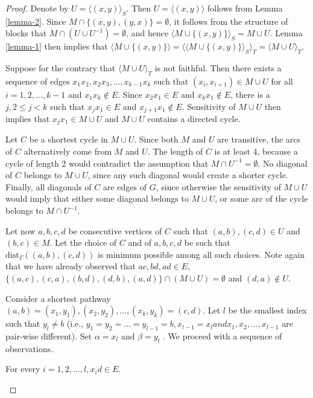 \begin{proof}
	Denote by $U = \langle(x, y)\rangle_S$. Then $U = \langle(x, y)\rangle$ follows from Lemma \ref{lemma-2}. Since $M \cap \{(x, y), (y, x)\} = \emptyset$, it follows from the structure of blocks that $M \cap (U \cup U^{-1}) = \emptyset$, and hence $\langle M \cup \{(x, y)\}\rangle_S = M \cup U$. Lemma \ref{lemma-1} then implies that $\langle M \cup \{(x, y)\}\rangle = \langle\langle M \cup \{(x, y)\}\rangle_S \rangle_T = \langle M \cup U \rangle_T$.
	
	Suppose for the contrary that $\langle M \cup U \rangle_T$ is not faithful. Then there exists a sequence of edges $x_1 x_2 , x_2 x_3 , \dots, x_{k-1} x_k$ such that $(x_i , x_{i+1}) \in M \cup U$ for all $i = 1, 2, \dots, k - 1$ and $x_1 x_k \notin E$. Since $x_2 x_1 \in E$ and $x_k x_1 \notin E$, there is a $j, 2 \leq j < k$ such that $x_j x_1 \in E$ and $x_{j+1} x_1 \notin E$. Sensitivity of $M \cup U$ then implies that $x_j x_1 \in M \cup U$ and $M \cup U$ contains a directed cycle.
	
	Let $C$ be a shortest cycle in $M \cup U$. Since both $M$ and $U$ are transitive, the arcs of $C$ alternatively come from $M$ and $U$. The length of $C$ is at least 4, because a cycle of length 2 would contradict the assumption that $M \cap U^{-1} = \emptyset$. No diagonal of $C$ belongs to $M \cup U$, since any such diagonal would create a shorter cycle. Finally, all diagonals of $C$ are edges of $G$, since otherwise the sensitivity of $M \cup U$ would imply that either some diagonal belongs to $M \cup U$, or some arc of the cycle belongs to $M \cap U^{-1}$.
	
	Let now $a, b, c, d$ be consecutive vertices of $C$ such that $(a, b), (c, d) \in U$ and $(b, c) \in M$. Let the choice of $C$ and of $a, b, c, d$ be such that $\text{dist}_\Gamma ((a, b), (c, d))$ is minimum possible among all such choices. Note again that we have already observed that $ac, bd, ad \in E$, $\{(a, c), (c, a), (b, d), (d, b), (a, d)\} \cap (M \cup U) = \emptyset$ and $(d, a) \notin U$.
	
	Consider a shortest pathway $(a, b) = (x_1 , y_1), (x_2 , y_2), \dots , (x_k , y_k) = (c, d)$. Let $l$ be the smallest
	index such that $y_l \neq b$ (i.e., $y_1 = y_2 = \dots = y_{l-1} = b, x_{l-1} = x_l and x_1 , x_2 , \dots , x_{l-1}$ are pair-wise
	different). Set $\alpha = x_l$ and $\beta = y_l$ . We proceed with a sequence of observations.

	\begin{claim}
		For every $i = 1, 2, \dots , l, x_i d \in E$.
	\end{claim}
	

\end{proof}
